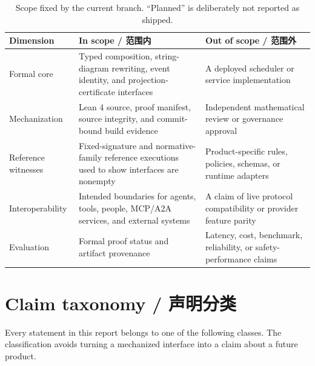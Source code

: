 \begin{table}[H]
\centering
\caption{Scope fixed by the current branch. “Planned” is deliberately not reported as shipped.}
\label{tab:scope}
\begin{tabularx}{\textwidth}{@{}L{0.22\textwidth}YY@{}}
\toprule
{}
\textbf{Dimension} & \textbf{In scope / 范围内} & \textbf{Out of scope / 范围外} \\
\midrule
Formal core & Typed composition, string-diagram rewriting, event identity, and projection-certificate interfaces & A deployed scheduler or service implementation \\
Mechanization & Lean 4 source, proof manifest, source integrity, and commit-bound build evidence & Independent mathematical review or governance approval \\
Reference witnesses & Fixed-signature and normative-family reference executions used to show interfaces are nonempty & Product-specific rules, policies, schemas, or runtime adapters \\
Interoperability & Intended boundaries for agents, tools, people, MCP/A2A services, and external systems & A claim of live protocol compatibility or provider feature parity \\
Evaluation & Formal proof status and artifact provenance & Latency, cost, benchmark, reliability, or safety-performance claims \\
\bottomrule
\end{tabularx}
\end{table}

\section{Claim taxonomy / 声明分类}

Every statement in this report belongs to one of the following classes. The classification avoids
turning a mechanized interface into a claim about a future product.

